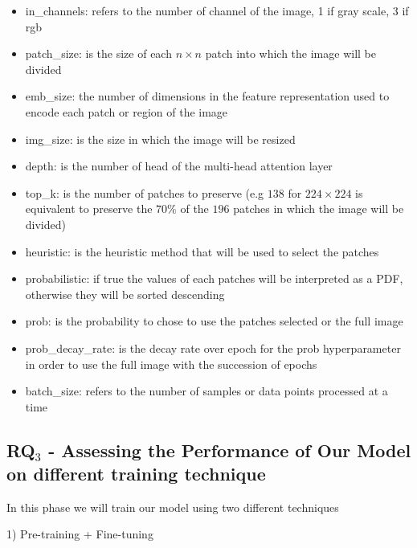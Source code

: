 \begin{itemize}
    \item in\_channels: refers to the number of channel of the image, 1 if gray scale, 3 if rgb
    \item patch\_size: is the size of each $n \times n$ patch into which the image will be divided
    \item emb\_size: the number of dimensions in the feature representation used to encode each patch or region of the image
    \item img\_size: is the size in which the image will be resized
    \item depth: is the number of head of the multi-head attention layer
    \item top\_k: is the number of patches to preserve (e.g $138$ for $224 \times 224$ is equivalent to preserve the $70\%$ of the $196$ patches in which the image will be divided)
    \item heuristic: is the heuristic method that will be used to select the patches
    \item probabilistic: if true the values of each patches will be interpreted as a PDF, otherwise they will be sorted descending
    \item prob: is the probability to chose to use the patches selected or the full image
    \item prob\_decay\_rate: is the decay rate over epoch for the prob hyperparameter in order to use the full image with the succession of epochs
    \item batch\_size: refers to the number of samples or data points processed at a time
\end{itemize}


\subsection{\textbf{RQ$_{3}$} - Assessing the Performance of Our Model on different training technique} In this phase we will train our model using two different techniques

1) Pre-training + Fine-tuning

